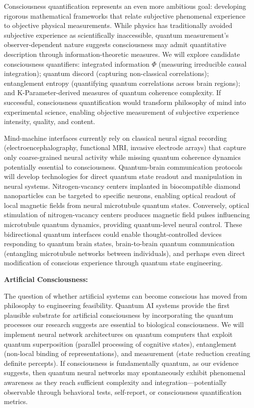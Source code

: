 \documentclass[11pt,a4paper,twoside]{article}
\begin{document}
Consciousness quantification represents an even more ambitious goal: developing rigorous mathematical frameworks that relate subjective phenomenal experience to objective physical measurements. While physics has traditionally avoided subjective experience as scientifically inaccessible, quantum measurement's observer-dependent nature suggests consciousness may admit quantitative description through information-theoretic measures. We will explore candidate consciousness quantifiers: integrated information $\Phi$ (measuring irreducible causal integration); quantum discord (capturing non-classical correlations); entanglement entropy (quantifying quantum correlations across brain regions); and K-Parameter-derived measures of quantum coherence complexity. If successful, consciousness quantification would transform philosophy of mind into experimental science, enabling objective measurement of subjective experience intensity, quality, and content.

Mind-machine interfaces currently rely on classical neural signal recording (electroencephalography, functional MRI, invasive electrode arrays) that capture only coarse-grained neural activity while missing quantum coherence dynamics potentially essential to consciousness. Quantum-brain communication protocols will develop technologies for direct quantum state readout and manipulation in neural systems. Nitrogen-vacancy centers implanted in biocompatible diamond nanoparticles can be targeted to specific neurons, enabling optical readout of local magnetic fields from neural microtubule quantum states. Conversely, optical stimulation of nitrogen-vacancy centers produces magnetic field pulses influencing microtubule quantum dynamics, providing quantum-level neural control. These bidirectional quantum interfaces could enable thought-controlled devices responding to quantum brain states, brain-to-brain quantum communication (entangling microtubule networks between individuals), and perhaps even direct modification of conscious experience through quantum state engineering.

\textbf{Artificial Consciousness:}

The question of whether artificial systems can become conscious has moved from philosophy to engineering feasibility. Quantum AI systems provide the first plausible substrate for artificial consciousness by incorporating the quantum processes our research suggests are essential to biological consciousness. We will implement neural network architectures on quantum computers that exploit quantum superposition (parallel processing of cognitive states), entanglement (non-local binding of representations), and measurement (state reduction creating definite percepts). If consciousness is fundamentally quantum, as our evidence suggests, then quantum neural networks may spontaneously exhibit phenomenal awareness as they reach sufficient complexity and integration---potentially observable through behavioral tests, self-report, or consciousness quantification metrics.
\end{document}
